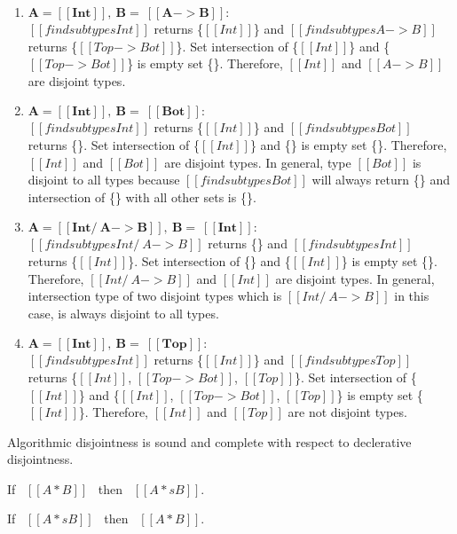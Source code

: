 \begin{enumerate}
  \item $\boldsymbol{A = [[Int]], \ B = \ [[A -> B]]:}$ \\
        $[[findsubtypes Int]]$ returns \{$[[Int]]$\} and $[[findsubtypes A -> B]]$ returns
        \{$[[Top -> Bot]]$\}. Set intersection of \{$[[Int]]$\} and \{$[[Top -> Bot]]$\} is
        empty set \{\}. Therefore, $[[Int]]$ and $[[A -> B]]$ are disjoint types.
  \item $\boldsymbol{A = [[Int]], \ B = \ [[Bot]]:}$ \\
        $[[findsubtypes Int]]$ returns \{$[[Int]]$\} and $[[findsubtypes Bot]]$ returns
        \{\}. Set intersection of \{$[[Int]]$\} and \{\} is
        empty set \{\}. Therefore, $[[Int]]$ and $[[Bot]]$ are disjoint types.
        In general, type $[[Bot]]$ is disjoint to all types because $[[findsubtypes Bot]]$
        will always return \{\} and intersection of \{\} with all other sets is \{\}.
  \item $\boldsymbol{A = [[Int /\ A -> B]], \ B = \ [[Int]]:}$ \\
        $[[findsubtypes Int /\ A -> B]]$ returns \{\} and $[[findsubtypes Int]]$ returns
        \{$[[Int]]$\}. Set intersection of \{\} and \{$[[Int]]$\} is
        empty set \{\}. Therefore, $[[Int /\ A -> B]]$ and $[[Int]]$ are disjoint types.
        In general, intersection type of two disjoint types which is $[[Int /\ A -> B]]$ in this case,
        is always disjoint to all types.
  \item $\boldsymbol{A = [[Int]], \ B = \ [[Top]]:}$ \\
        $[[findsubtypes Int]]$ returns \{$[[Int]]$\} and $[[findsubtypes Top]]$ returns
        \{$[[Int]]$, $[[Top -> Bot]]$, $[[Top]]$\}.
        Set intersection of \{$[[Int]]$\} and \{$[[Int]]$, $[[Top -> Bot]]$, $[[Top]]$\} is
        empty set \{$[[Int]]$\}. Therefore, $[[Int]]$ and $[[Top]]$ are not disjoint types.
\end{enumerate}

Algorithmic disjointness is sound and complete with respect to declerative disjointness.

\begin{lemma}
  If \ $[[A * B]]$ \ then \ $[[A *s B]]$.
\label{lemma:inter:disj-sound}
\end{lemma}

\begin{lemma}
  If \ $[[A *s B]]$ \ then \ $[[A * B]]$.
\label{lemma:inter:disj-complete}
\end{lemma}

